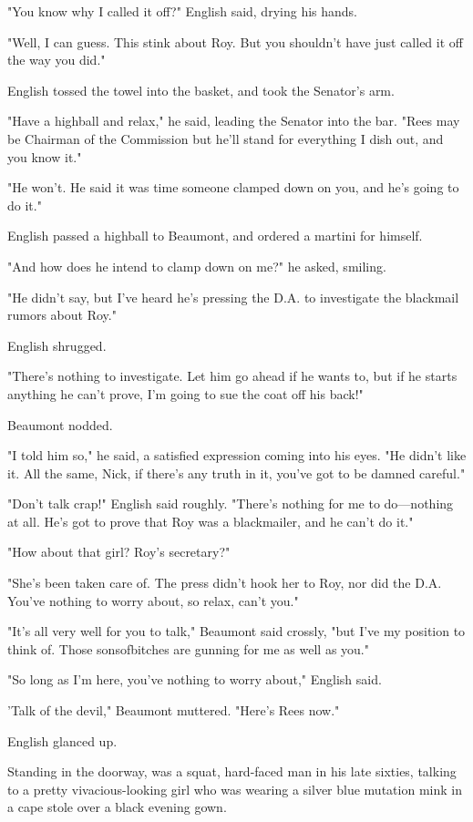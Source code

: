 \documentclass{novel}
\begin{document}
"You know why I called it off?" English said, drying his hands.

"Well, I can guess. This stink about Roy. But you shouldn't have just called it off the way you did."

English tossed the towel into the basket, and took the Senator's arm.

"Have a highball and relax," he said, leading the Senator into the bar. "Rees may be Chairman of the Commission but he'll stand for everything I dish out, and you know it."

"He won't. He said it was time someone clamped down on you, and he's going to do it."

English passed a highball to Beaumont, and ordered a martini for himself.

"And how does he intend to clamp down on me?" he asked, smiling.

"He didn't say, but I've heard he's pressing the D.A. to investigate the blackmail rumors about Roy."

English shrugged.

"There's nothing to investigate. Let him go ahead if he wants to, but if he starts anything he can't prove, I'm going to sue the coat off his back!"

Beaumont nodded.

"I told him so," he said, a satisfied expression coming into his eyes. "He didn't like it. All the same, Nick, if there's any truth in it, you've got to be damned careful."

"Don't talk crap!" English said roughly. "There's nothing for me to do—nothing at all. He's got to prove that Roy was a blackmailer, and he can't do it."

"How about that girl? Roy's secretary?"

"She's been taken care of. The press didn't hook her to Roy, nor did the D.A. You've nothing to worry about, so relax, can't you."

"It's all very well for you to talk," Beaumont said crossly, "but I've my position to think of. Those sonsofbitches are gunning for me as well as you."

"So long as I'm here, you've nothing to worry about," English said.

'Talk of the devil," Beaumont muttered. "Here's Rees now."

English glanced up.

Standing in the doorway, was a squat, hard-faced man in his late sixties, talking to a pretty vivacious-looking girl who was wearing a silver blue mutation mink in a cape stole over a black evening gown.
\end{document}
